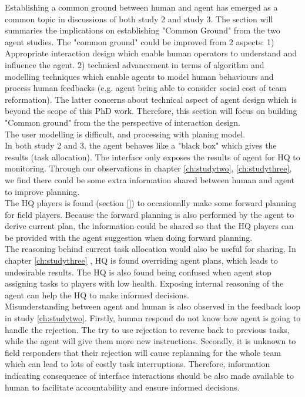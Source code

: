 Establishing a common ground between human and agent has emerged as a common topic in discussions of both study 2 and study 3. The section will summaries the implications on establishing "Common Ground" from the two agent studies. The "common ground" could be improved from 2 aspects:  1) Appropriate interaction design which enable human operators to understand and influence the agent. 2) technical advancement in terms of algorithm and modelling techniques which enable agents to model human behaviours and process human feedbacks (e.g. agent being able to consider social cost of team reformation). The latter concerns about technical aspect of agent design which is beyond the scope of this PhD work. Therefore, this section will focus on building "Common ground" from the the perspective of interaction design. \\

The user modelling is difficult, and processing with planing model.\\

In both study 2 and 3, the agent behaves like a "black box" which gives the results (task allocation). The interface only exposes the results of agent for HQ to monitoring. Through our observations in chapter \ref{ch:studytwo}, \ref{ch:studythree}, we find there could be some extra information shared between human and agent to improve planning.\\

The HQ players is found (section \ref{}) to occasionally make some forward planning for field players. Because the forward planning is also performed by the agent to derive current plan, the information could be shared so that the HQ players can be provided with the agent suggestion when doing forward planning.\\

The reasoning behind current task allocation would also be useful for sharing. In chapter \ref{ch:studythree} , HQ is found overriding agent plans, which leads to undesirable results. The HQ is also found being confused when agent stop assigning tasks to players with low health. Exposing internal reasoning of the agent can help the HQ to make informed decisions. \\

Misunderstanding between agent and human is also observed in the feedback loop in study \ref{ch:studytwo}. Firstly, human respond do not know how agent is going to handle the rejection. The try to use rejection to reverse back to previous tasks, while the agent will give them more new instructions. Secondly, it is unknown to field responders that their rejection will cause replanning for the whole team which can lead to lots of costly task interruptions. Therefore, information indicating consequence of interface interactions should be also made available to human to facilitate accountability and ensure informed decisions. \\

